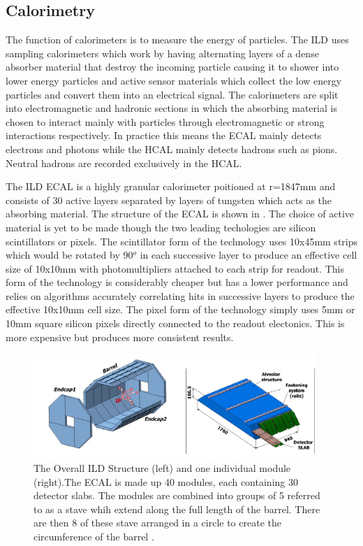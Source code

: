 \subsection{Calorimetry}

The function of calorimeters is to measure the energy of particles. The ILD uses sampling calorimeters which work by having alternating layers of a dense absorber material that destroy the incoming particle causing it to shower into lower energy particles and active sensor materials which collect the low energy particles and convert them into an electrical signal. The calorimeters are split into electromagnetic and hadronic sections in which the absorbing material is chosen to interact mainly with particles through electromagnetic or strong interactions respectively. In practice this means the \ac{ECAL} mainly detects electrons and photons while the \ac{HCAL} mainly detects hadrons such as pions. Neutral hadrons are recorded exclusively in the \ac{HCAL}.

The ILD ECAL is a highly granular calorimeter poitioned at r=1847mm and consists of 30 active layers separated by layers of tungsten which acts as the absorbing material. The structure of the \ac{ECAL} is shown in . The choice of active material is yet to be made though the two leading techologies are silicon scintillators or pixels. The scintillator form of the technology uses 10x45mm strips which would be rotated by 90${^o}$ in each successive layer to produce an effective cell size of 10x10mm with photomultipliers attached to each strip for readout. This form of the technology is considerably cheaper but has a lower performance and relies on algorithms accurately correlating hits in successive layers to produce the effective 10x10mm cell size. The pixel form of the technology simply uses 5mm or 10mm square silicon pixels directly connected to the readout electonics. This is more expensive but produces more consistent results.

\begin{figure}[h]
  \centering
  \includegraphics[width=0.95\textwidth,keepaspectratio]{fig/ecalstructure} %
  \caption[ECAL Structure]{The Overall ILD Structure (left) and one individual module (right).The ECAL is made up 40 modules, each containing 30 detector slabs. The modules are combined into groups of 5 referred to as a stave whih extend along the full length of the barrel. There are then 8 of these stave arranged in a circle to create the circumference of the barrel \cite{ILD}.}
  \label{Fig:ECAL}
\end{figure}

